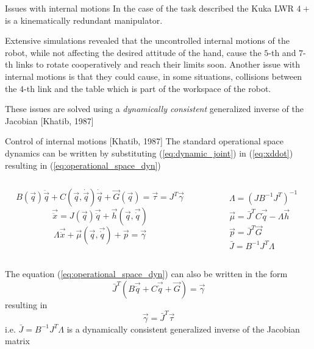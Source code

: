 \begin{frame}{Issues with internal motions}
  In the case of the task described the Kuka LWR $4+$ is a kinematically redundant manipulator.
  \par
  Extensive simulations revealed
  that the uncontrolled internal motions of the robot, while not affecting the
  desired attitude of the hand, cause the $5$-th and $7$-th links to rotate
  cooperatively and reach their limits soon. Another issue with internal motions
  is that they could cause, in some situations, collisions between the $4$-th
  link and the table which is part of the workspace of the robot.
  \par
  These issues are solved using a \emph{dynamically consistent} generalized inverse of the Jacobian [Khatib, 1987]
\end{frame}
  
\begin{frame}{Control of internal motions [Khatib, 1987]}
  The standard operational space dynamics can be written by substituting
  (\ref{eq:dynamic_joint}) in (\ref{eq:xddot}) resulting in (\ref{eq:operational_space_dyn})
  \begin{columns}
    \begin{column}{0.7\columnwidth}
      \begin{equation}\label{eq:dynamic_joint}
      B(\vec{q}) \ddot{\vec{q}} + C(\vec{q}, \dot{\vec{q}}) \dot{\vec{q}} + \vec{G}(\vec{q}) = \vec{\tau} = J^{T} \vec{\gamma}
      \end{equation}
      \begin{equation}\label{eq:xddot}
        \vec{\ddot{x}} = J(\vec{q}) \vec{\ddot{q}} + \vec{h}(\vec{q},\vec{\dot{q}})
      \end{equation}
      \begin{equation}\label{eq:operational_space_dyn}
        \Lambda \vec{\ddot{x}} + \vec{\mu}(\vec{q}, \vec{\dot{q}}) + \vec{p} = \vec{\gamma}
      \end{equation}
    \end{column}
    \begin{column}{0.4\columnwidth}
      \[
      \begin{split}
        &\Lambda = (J B^{-1} J^{T})^{-1}\\
        &\vec{\mu} = \bar{J}^{T} C \vec{\dot{q}} - \Lambda \vec{h}\\
        &\vec{p} = \bar{J}^T \vec{G}\\
        &\bar{J} = B^{-1} J^{T} \Lambda
      \end{split}
      \]
    \end{column}
  \end{columns}
The equation (\ref{eq:operational_space_dyn}) can also be written in the form
\[
\bar{J}^{T} (B \vec{\ddot{q}} + C \vec{\dot{q}} + \vec{G}) = \vec{\gamma}
\]
resulting in 
\[
\vec{\gamma} = \bar{J}^{T} \vec{\tau}
\]
i.e. $\bar{J} = B^{-1} J^{T} \Lambda$ is a dynamically consistent generalized inverse of the Jacobian matrix
\end{frame}


